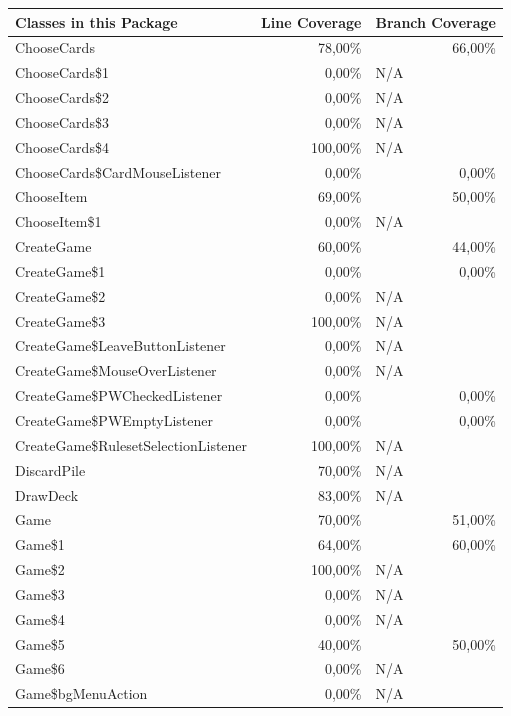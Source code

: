 \documentclass[a4paper]{article}
\begin{document}
\noindent
\begin{tabular}{|l|r|l|}
\hline
Classes in this Package & \multicolumn{1}{l|}{Line Coverage} & Branch Coverage \\ \hline
ChooseCards & 78,00\% & \multicolumn{1}{r|}{66,00\%} \\ \hline
ChooseCards\$1 & 0,00\% & N/A \\ \hline
ChooseCards\$2 & 0,00\% & N/A \\ \hline
ChooseCards\$3 & 0,00\% & N/A \\ \hline
ChooseCards\$4 & 100,00\% & N/A \\ \hline
ChooseCards\$CardMouseListener & 0,00\% & \multicolumn{1}{r|}{0,00\%} \\ \hline
ChooseItem & 69,00\% & \multicolumn{1}{r|}{50,00\%} \\ \hline
ChooseItem\$1 & 0,00\% & N/A \\ \hline
CreateGame & 60,00\% & \multicolumn{1}{r|}{44,00\%} \\ \hline
CreateGame\$1 & 0,00\% & \multicolumn{1}{r|}{0,00\%} \\ \hline
CreateGame\$2 & 0,00\% & N/A \\ \hline
CreateGame\$3 & 100,00\% & N/A \\ \hline
CreateGame\$LeaveButtonListener & 0,00\% & N/A \\ \hline
CreateGame\$MouseOverListener & 0,00\% & N/A \\ \hline
CreateGame\$PWCheckedListener & 0,00\% & \multicolumn{1}{r|}{0,00\%} \\ \hline
CreateGame\$PWEmptyListener & 0,00\% & \multicolumn{1}{r|}{0,00\%} \\ \hline
CreateGame\$RulesetSelectionListener & 100,00\% & N/A \\ \hline
DiscardPile & 70,00\% & N/A \\ \hline
DrawDeck & 83,00\% & N/A \\ \hline
Game & 70,00\% & \multicolumn{1}{r|}{51,00\%} \\ \hline
Game\$1 & 64,00\% & \multicolumn{1}{r|}{60,00\%} \\ \hline
Game\$2 & 100,00\% & N/A \\ \hline
Game\$3 & 0,00\% & N/A \\ \hline
Game\$4 & 0,00\% & N/A \\ \hline
Game\$5 & 40,00\% & \multicolumn{1}{r|}{50,00\%} \\ \hline
Game\$6 & 0,00\% & N/A \\ \hline
Game\$bgMenuAction & 0,00\% & N/A \\ \hline

\end{tabular}
\end{document}
